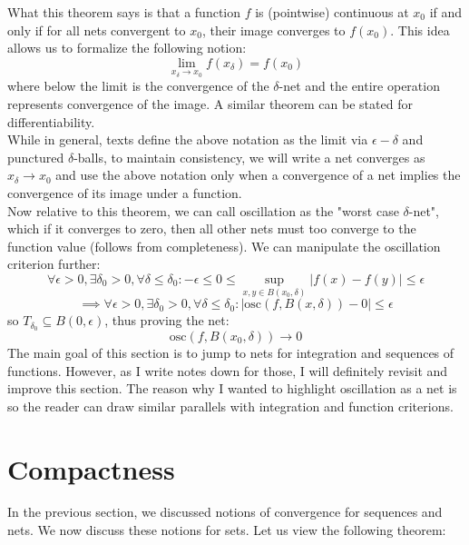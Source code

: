 \documentclass[10pt,letterpaper]{article} %
\begin{document}
What this theorem says is that a function $f$ is (pointwise) continuous at $x_0$ if and only if for all nets convergent to $x_0$, their image converges to $f(x_0)$. This idea allows us to formalize the following notion:
\begin{equation*}
\lim_{x_\delta \xrightarrow{} x_0} f(x_\delta) = f(x_0)
\end{equation*}
where below the limit is the convergence of the $\delta$-net and the entire operation represents convergence of the image. A similar theorem can be stated for differentiability.\\

While in general, texts define the above notation as the limit via $\epsilon-\delta$ and punctured $\delta$-balls, to maintain consistency, we will write a net converges as $x_\delta \xrightarrow{} x_0$ and use the above notation only when a convergence of a net implies the convergence of its image under a function.\\

Now relative to this theorem, we can call oscillation as the "worst case $\delta$-net", which if it converges to zero, then all other nets must too converge to the function value (follows from completeness). We can manipulate the oscillation criterion further:
\begin{equation*}
\forall \epsilon > 0, \exists \delta_0 > 0, \forall \delta \leqslant \delta_0: - \epsilon \leqslant 0 \leqslant \sup_{x, y \in B(x_0, \delta)}|f(x) - f(y)| \leqslant \epsilon  
\end{equation*}
\begin{equation*}
\implies \forall \epsilon > 0, \exists \delta_0 > 0, \forall \delta \leqslant \delta_0: \left|\text{osc}(f, B(x, \delta))-0\right| \leqslant \epsilon
\end{equation*}
so $T_{\delta_0} \subseteq B(0, \epsilon)$, thus proving the net:
\begin{equation*}
\text{osc}(f, B(x_0, \delta)) \xrightarrow{} 0
\end{equation*}
The main goal of this section is to jump to nets for integration and sequences of functions. However, as I write notes down for those, I will definitely revisit and improve this section. The reason why I wanted to highlight oscillation as a net is so the reader can draw similar parallels with integration and function criterions.
\pagebreak

\section{Compactness}
In the previous section, we discussed notions of convergence for sequences and nets. We now discuss these notions for sets. Let us view the following theorem:
\end{document}
